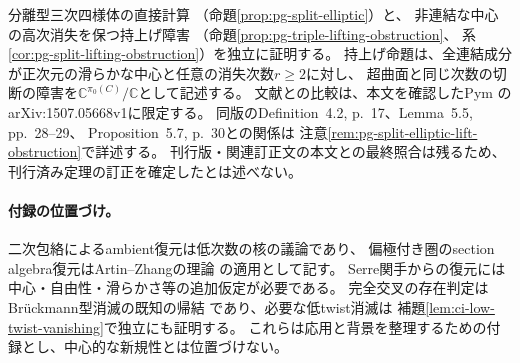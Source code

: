 分離型三次四様体の直接計算
（命題\ref{prop:pg-split-elliptic}）と、
非連結な中心の高次消失を保つ持上げ障害
（命題\ref{prop:pg-triple-lifting-obstruction}、
系\ref{cor:pg-split-lifting-obstruction}）を独立に証明する。
持上げ命題は、全連結成分が正次元の滑らかな中心と任意の消失次数$r\ge2$に対し、
超曲面と同じ次数の切断の障害を$\mathbb C^{\pi_0(C)}/\mathbb C$として記述する。
文献との比較は、本文を確認したPym
\cite{PPymElliptic}のarXiv:1507.05668v1に限定する。
同版のDefinition~4.2, p.~17、Lemma~5.5, pp.~28--29、
Proposition~5.7, p.~30との関係は
注意\ref{rem:pg-split-elliptic-lift-obstruction}で詳述する。
刊行版・関連訂正文の本文との最終照合は残るため、
刊行済み定理の訂正を確定したとは述べない。

\paragraph{付録の位置づけ。}
二次包絡によるambient復元は低次数の核の議論であり、
偏極付き圏のsection algebra復元はArtin--Zhangの理論
\cite{PAZAmbient}の適用として記す。
Serre関手からの復元には中心・自由性・滑らかさ等の追加仮定が必要である。
完全交叉の存在判定はBr\"uckmann型消滅の既知の帰結
\cite[Lemma~4.1]{FuHwangCI}であり、必要な低twist消滅は
補題\ref{lem:ci-low-twist-vanishing}で独立にも証明する。
これらは応用と背景を整理するための付録とし、中心的な新規性とは位置づけない。

